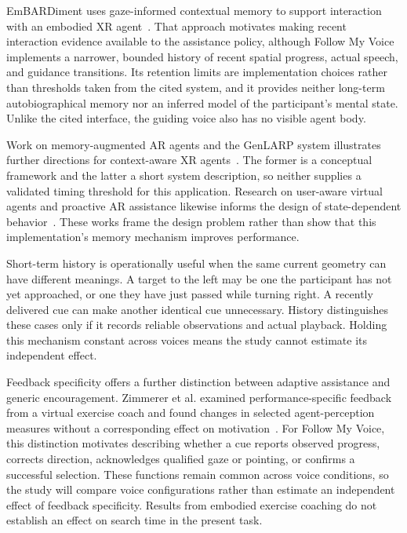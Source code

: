 EmBARDiment uses gaze-informed contextual memory to support interaction with an embodied XR agent~\cite{bovo2025embardiment}. That approach motivates making recent interaction evidence available to the assistance policy, although Follow My Voice implements a narrower, bounded history of recent spatial progress, actual speech, and guidance transitions. Its retention limits are implementation choices rather than thresholds taken from the cited system, and it provides neither long-term autobiographical memory nor an inferred model of the participant's mental state. Unlike the cited interface, the guiding voice also has no visible agent body.

Work on memory-augmented AR agents and the GenLARP system illustrates further directions for context-aware XR agents~\cite{choi2025memory,yu2025genlarp}. The former is a conceptual framework and the latter a short system description, so neither supplies a validated timing threshold for this application. Research on user-aware virtual agents and proactive AR assistance likewise informs the design of state-dependent behavior~\cite{gunawardhana2024useraware,li2025satori}. These works frame the design problem rather than show that this implementation's memory mechanism improves performance.

Short-term history is operationally useful when the same current geometry can have different meanings. A target to the left may be one the participant has not yet approached, or one they have just passed while turning right. A recently delivered cue can make another identical cue unnecessary. History distinguishes these cases only if it records reliable observations and actual playback. Holding this mechanism constant across voices means the study cannot estimate its independent effect.

Feedback specificity offers a further distinction between adaptive assistance and generic encouragement. Zimmerer et al. examined performance-specific feedback from a virtual exercise coach and found changes in selected agent-perception measures without a corresponding effect on motivation~\cite{zimmerer2025feedback}. For Follow My Voice, this distinction motivates describing whether a cue reports observed progress, corrects direction, acknowledges qualified gaze or pointing, or confirms a successful selection. These functions remain common across voice conditions, so the study will compare voice configurations rather than estimate an independent effect of feedback specificity. Results from embodied exercise coaching do not establish an effect on search time in the present task.

